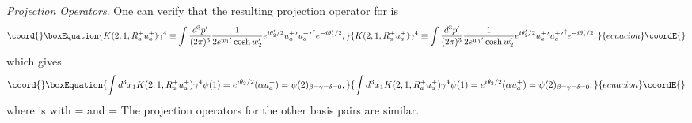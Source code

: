 \documentclass[a4paper,12pt]{article}
\begin{document}
	{\textit{Projection Operators}}. One can verify that the resulting projection operator for \coordHE{} is
\begin{equation}\coord{}\boxEquation{	\label{K(2,1)ab}
  K(2,1,R_{a}^{+} u_{a}^{+}) \gamma^{4} \equiv \int \frac{d^3 p^{\prime} }{(2 \pi)^3} \frac{1}{2 e^{{w_{1}}^{\prime}} \cosh w_{2}^{\prime}}e^{i \theta_{2}^{\prime}/2}  u_{a}^{+ \, \prime} {u_{a}^{+ \, \prime }}^{\dagger} e^{ -i \theta_{1}^{\prime}/2} ,
}{	K(2,1,R_{a}^{+} u_{a}^{+}) \gamma^{4} \equiv \int \frac{d^3 p^{\prime} }{(2 \pi)^3} \frac{1}{2 e^{{w_{1}}^{\prime}} \cosh w_{2}^{\prime}}e^{i \theta_{2}^{\prime}/2}  u_{a}^{+ \, \prime} {u_{a}^{+ \, \prime }}^{\dagger} e^{ -i \theta_{1}^{\prime}/2} ,
}{ecuacion}\coordE{}\end{equation} 
which gives
\begin{equation}\coord{}\boxEquation{	\label{K(2,1)psiab}
 \int d^{3} x_{1} K(2,1,R_{a}^{+} u_{a}^{+}) \gamma^{4} \psi(1) =  e^{i \theta_{2} / 2} (\alpha  u_{a}^{+}) = \psi(2)_{\beta = \gamma = \delta = 0},
}{	\int d^{3} x_{1} K(2,1,R_{a}^{+} u_{a}^{+}) \gamma^{4} \psi(1) =  e^{i \theta_{2} / 2} (\alpha  u_{a}^{+}) = \psi(2)_{\beta = \gamma = \delta = 0},
}{ecuacion}\coordE{}\end{equation}
where \coordHE{} is \myHighlight{$\psi$}\coordHE{} with \myHighlight{$\theta$}\coordHE{} = \coordHE{} and \coordHE{} = \coordHE{} The projection operators for the other basis pairs are similar.
\end{document}
